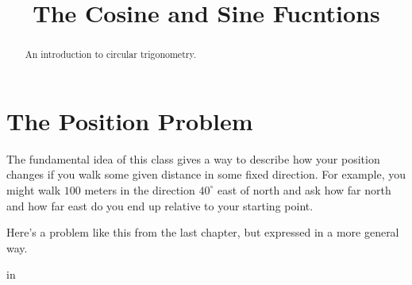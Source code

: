 \documentclass{ximera}
\title{The Cosine and Sine Fucntions}
\newcommand{\pskip}{\vskip 0.1 in}
\begin{document}
\begin{abstract}
An introduction to circular trigonometry.
\end{abstract}
\maketitle

\section{The Position Problem}

The fundamental idea of this class gives a way to describe how your position changes if you walk some given distance in some fixed direction. For example, you might walk $100$ meters in the direction $40^\circ$ east of north and ask how far north and how far east do you end up relative to your starting point.

Here's a problem like this from the last chapter, but expressed in a more general way.

\pskip
\end{document}
